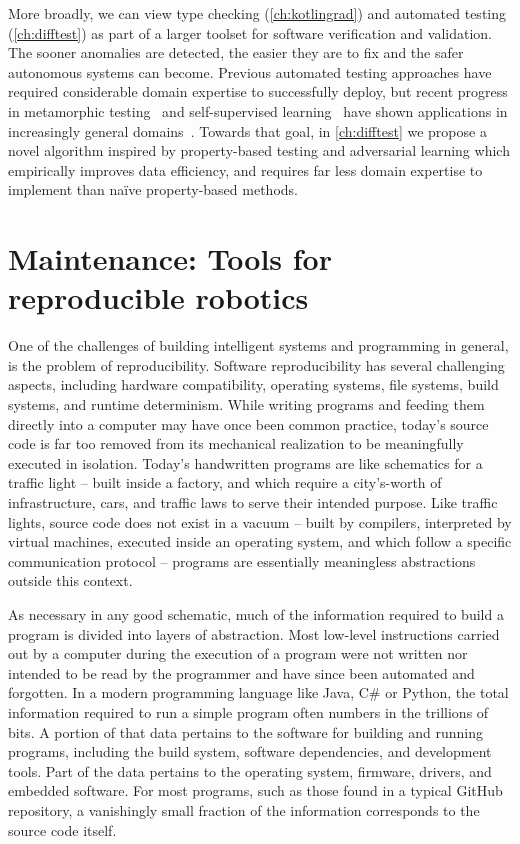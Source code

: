 More broadly, we can view type checking (\autoref{ch:kotlingrad}) and automated testing (\autoref{ch:difftest}) as part of a larger toolset for software verification and validation. The sooner anomalies are detected, the easier they are to fix and the safer autonomous systems can become. Previous automated testing approaches have required considerable domain expertise to successfully deploy, but recent progress in metamorphic testing~\citep{chen1998metamorphic} and self-supervised learning~\citep{lieb2005adaptive} have shown applications in increasingly general domains~\citep{zhang2020testing}. Towards that goal, in \autoref{ch:difftest} we propose a novel algorithm inspired by property-based testing and adversarial learning which empirically improves data efficiency, and requires far less domain expertise to implement than na\"ive property-based methods.

\section{Maintenance: Tools for reproducible robotics}

One of the challenges of building intelligent systems and programming in general, is the problem of reproducibility. Software reproducibility has several challenging aspects, including hardware compatibility, operating systems, file systems, build systems, and runtime determinism. While writing programs and feeding them directly into a computer may have once been common practice, today's source code is far too removed from its mechanical realization to be meaningfully executed in isolation. Today's handwritten programs are like schematics for a traffic light -- built inside a factory, and which require a city's-worth of infrastructure, cars, and traffic laws to serve their intended purpose. Like traffic lights, source code does not exist in a vacuum -- built by compilers, interpreted by virtual machines, executed inside an operating system, and which follow a specific communication protocol -- programs are essentially meaningless abstractions outside this context.

As necessary in any good schematic, much of the information required to build a program is divided into layers of abstraction. Most low-level instructions carried out by a computer during the execution of a program were not written nor intended to be read by the programmer and have since been automated and forgotten. In a modern programming language like Java, C\# or Python, the total information required to run a simple program often numbers in the trillions of bits. A portion of that data pertains to the software for building and running programs, including the build system, software dependencies, and development tools. Part of the data pertains to the operating system, firmware, drivers, and embedded software. For most programs, such as those found in a typical GitHub repository, a vanishingly small fraction of the information corresponds to the source code itself.

